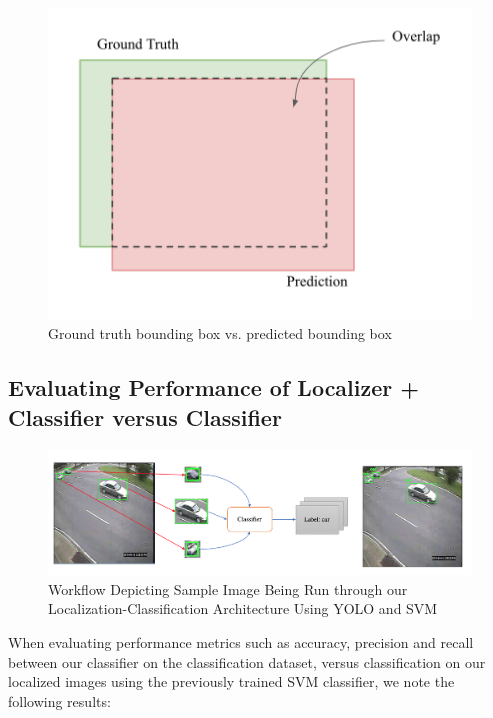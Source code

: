 \documentclass[12pt]{article}
\begin{document}
\begin{figure}[!htb]
    \centering
    \includegraphics[width=.8\linewidth]{detection_overlap.png}
    \caption{Ground truth bounding box vs. predicted bounding box}
    \label{fig:detection-img}
\end{figure}

\subsection{Evaluating Performance of Localizer + Classifier versus Classifier}

\begin{figure}[H]
  \hfill\includegraphics[width=1.1\textwidth]{local_clf.png}\hspace*{\fill}
  \caption{Workflow Depicting Sample Image Being Run through our Localization-Classification Architecture Using YOLO and SVM}
\end{figure}

When evaluating performance metrics such as accuracy, precision and recall between our classifier on the classification dataset, versus classification on our localized images using the previously trained SVM classifier, we note the following results:
\end{document}
